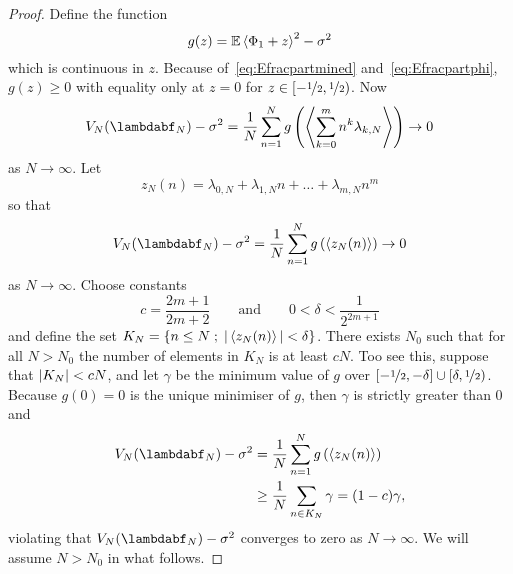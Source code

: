 \documentclass[journal]{IEEEtran}
\begin{document}
\begin{proof}
Define the function
\begin{equation}\label{eq:gz}
g(z) = {\mathbb E}\left\langle \Phi_1 + z \right\rangle^2 - \sigma^2
\end{equation}
which is continuous in $z$. Because of~\eqref{eq:Efracpartmined} and~\eqref{eq:Efracpartphi}, $g(z) \geq 0$ with equality only at $z = 0$ for $z \in [-\nicefrac{1}{2}, \nicefrac{1}{2})$. Now
\[
V_N(\lambdabf_N) - \sigma^2 = \frac{1}{N}\sum_{n=1}^{N} g\left( \fracpart{ \sum_{k=0}^{m}{n^k \lambda_{k,N}} } \right) \rightarrow 0
\]
as $N \rightarrow \infty$. Let
\[
z_N(n) = \lambda_{0,N} + \lambda_{1,N} n + \dots + \lambda_{m,N} n^m
\]
so that 
\[
V_N(\lambdabf_N) - \sigma^2 = \frac{1}{N}\sum_{n=1}^{N} g\left( \fracpart{z_N(n)} \right) \rightarrow 0
\] 
as $N \rightarrow \infty$.
Choose constants 
\[
c = \frac{2m+1}{2m+2} \qquad \text{and} \qquad 0 < \delta < \frac{1}{2^{2m+1}}
\]
and define the set $K_{N}=\left\{  n\leq N \; ; \; \vert \left\langle z_N(n) \right\rangle \vert < \delta \right\}$.  There exists $N_0$ such that for all $N > N_0$ the number of elements in $K_N$ is at least $cN$.  Too see this, suppose that $\vert K_N \vert < cN$, and let $\gamma$ be the minimum value of $g$ over $[-\nicefrac{1}{2},-\delta] \cup [\delta, \nicefrac{1}{2})$. Because $g(0) = 0$ is the unique minimiser of $g$, then $\gamma$ is strictly greater than $0$ and
\begin{align*}
V_N(\lambdabf_N) - \sigma^2 &= \frac{1}{N}\sum_{n=1}^{N} g\left( \fracpart{z_N(n)} \right) \\
&\geq \frac{1}{N}\sum_{n\in K_N} \gamma = (1-c)\gamma,
\end{align*}
violating that $V_N(\lambdabf_N) - \sigma^2$ converges to zero as $N \rightarrow \infty$.  We will assume $N > N_0$ in what follows.


\end{proof}
\end{document}
